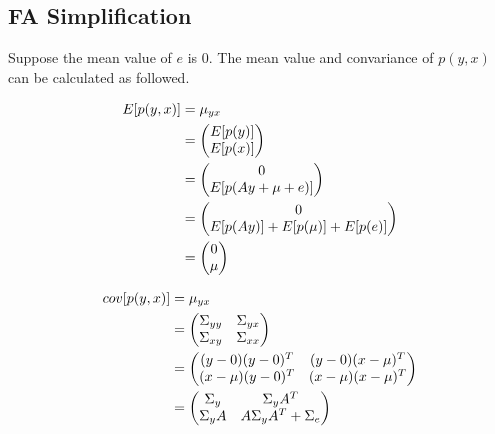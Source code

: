 \documentclass[12pt,a4paper]{article}
\theoremstyle{definition}
\begin{document}
\begin{appendix}
\subsection{FA Simplification}
\label{apd:fa}

Suppose the mean value of $e$ is 0. The mean value and convariance of $p(y, x)$ can be calculated as followed.

\begin{large}
\begin{align*}
	\centering
	E[p(y, x)] &= \mu_{yx} \\
	&= \left( \begin{matrix}
		E[p(y)] \\
		E[p(x)]
	\end{matrix}
	\right) \\
	&= \left( \begin{matrix}
		0 \\
		E[p(Ay+\mu+e)]
	\end{matrix}
	\right) \\
	&= \left( \begin{matrix}
		0 \\
		E[p(Ay)]+E[p(\mu)]+E[p(e)]
	\end{matrix}
	\right) \\
	&= \left( \begin{matrix}
		0 \\
		\mu
	\end{matrix}
	\right)
\end{align*}
\end{large}

\begin{large}
\begin{align*}
	\centering
	cov[p(y, x)] &= \mu_{yx} \\
	&= \left( \begin{matrix}
		\Sigma_{yy} & \Sigma_{yx} \\
		\Sigma_{xy} & \Sigma_{xx}
	\end{matrix}
	\right) \\
	&= \left( \begin{matrix}
		(y-0)(y-0)^T & (y-0)(x-\mu)^T \\
		(x-\mu)(y-0)^T & (x-\mu)(x-\mu)^T
	\end{matrix}
	\right) \\
	&= \left( \begin{matrix}
		\Sigma_y & \Sigma_yA^T \\
		\Sigma_yA & A\Sigma_yA^T+\Sigma_e
	\end{matrix}
	\right)
\end{align*}
\end{large}


\end{appendix}
\end{document}
